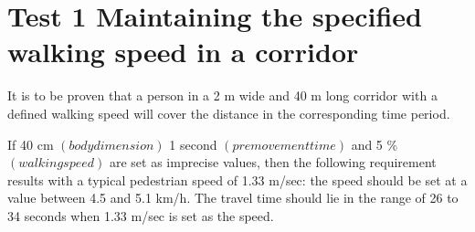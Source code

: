 \section*{Test 1 Maintaining the specified walking speed in a corridor}
It is to be proven that a person in a 2 m wide and 40 m  long  corridor  with  a  defined  walking  speed  will cover  the  distance  in  the  corresponding  time  period.

\noindent
If 40 cm $(body dimension)$ 1 second $(premovement time)$ and 5 \% $(walking speed)$ are set as imprecise values, then the following requirement results with a typical pedestrian speed of 1.33 m/sec: the speed should be set at a value between 4.5 and 5.1 km/h. The travel time should lie in the range of 26 to 34 seconds when 1.33 m/sec is set as the speed.
